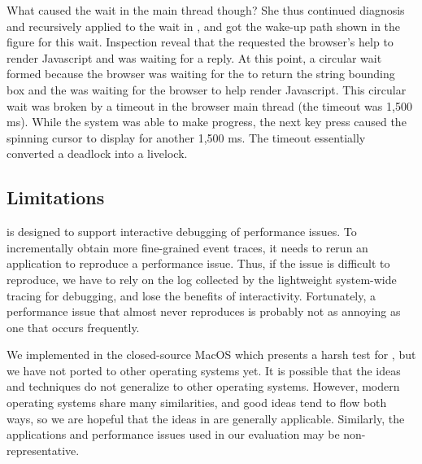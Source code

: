 What caused the wait in the  main thread though?  She thus
continued diagnosis and recursively applied \xxx to the wait in ,
and got the wake-up path shown in the figure for this wait.  Inspection reveal
that the  requested the browser's help to render Javascript and was
waiting for a reply.  At this point, a circular wait formed because the browser
was waiting for the  to return the string bounding box and the
 was waiting for the browser to help render Javascript.  This
circular wait was broken by a timeout in the browser main thread (the
 timeout was 1,500 ms).  While the system was able to make
progress, the next key press caused the spinning cursor to display for another
1,500 ms.  The timeout essentially converted a deadlock into a livelock.

\subsection{Limitations}

\xxx is designed to support interactive debugging of performance issues.  To
incrementally obtain more fine-grained event traces, it needs to rerun an
application to reproduce a performance issue.  Thus, if the issue is difficult
to reproduce, we have to rely on the log collected by the lightweight
system-wide tracing for debugging, and lose the benefits of interactivity.
Fortunately, a performance issue that almost never reproduces is probably not
as annoying as one that occurs frequently.

We implemented \xxx in the closed-source MacOS which presents a harsh test for
\xxx, but we have not ported \xxx to other operating systems yet.  It is
possible that the ideas and techniques do not generalize to other operating
systems.  However, modern operating systems share many similarities, and good
ideas tend to flow both ways, so we are hopeful that the ideas in \xxx are
generally applicable.  Similarly, the applications and performance issues used
in our evaluation may be non-representative.
